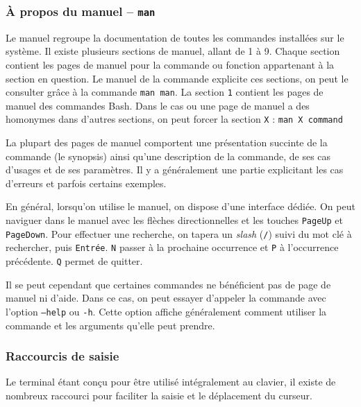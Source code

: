 \subsubsection{À propos du manuel -- \texttt{man}} 

Le manuel regroupe la documentation de toutes les commandes installées sur le système. Il existe plusieurs sections de manuel, allant de 1 à 9. Chaque section contient les pages de manuel pour la commande ou fonction appartenant à la section en question. Le manuel de la commande  explicite ces sections, on peut le consulter grâce à la commande \texttt{man man}. La section \texttt{1} contient les pages de manuel des commandes Bash. Dans le cas ou une page de manuel a des homonymes dans d'autres sections, on peut forcer la section \texttt{X} : \texttt{man X command}

La plupart des pages de manuel comportent une présentation succinte de la commande (le synopsis) ainsi qu'une description de la commande, de ses cas d'usages et de ses paramètres. Il y a généralement une partie explicitant les cas d'erreurs et parfois certains exemples.

En général, lorsqu'on utilise le manuel, on dispose d'une interface dédiée. On peut naviguer dans le manuel avec les flèches directionnelles et les touches \texttt{PageUp} et \texttt{PageDown}. Pour effectuer une recherche, on tapera un \textit{slash} (\texttt{/}) suivi du mot clé à rechercher, puis \texttt{Entrée}. \texttt{N} passer à la prochaine occurrence et \texttt{P} à l'occurrence précédente. \texttt{Q} permet de quitter.

Il se peut cependant que certaines commandes ne bénéficient pas de page de manuel ni d'aide. Dans ce cas, on peut essayer d'appeler la commande avec l'option \texttt{--help} ou \texttt{-h}. Cette option affiche généralement comment utiliser la commande et les arguments qu'elle peut prendre.

\newpage

\vspace{-4mm}
\subsubsection{Raccourcis de saisie}
\vspace{-2mm}

Le terminal étant conçu pour être utilisé intégralement au clavier, il existe de nombreux raccourci pour faciliter la saisie et le déplacement du curseur.

